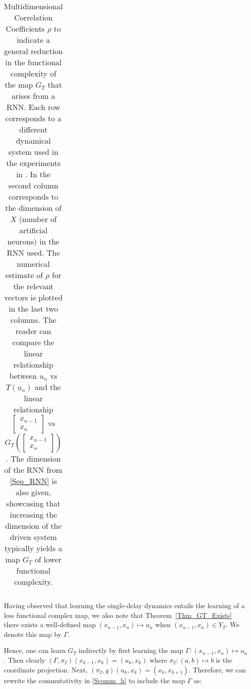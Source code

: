 \documentclass[12 pt]{article}
\begin{document}
\begin{center}
\begin{table}
{\begin{tabular}{|c|c| c c |}
    \end{tabular}}
    \caption{Multidimensional Correlation Coefficients $\rho$ to indicate a general reduction in the functional complexity of the map $G_T$ that arises from a RNN. Each row corresponds to a different dynamical system used in the experiments in \cite{Main_article}. In the second column corresponds to the dimension of $X$ (number of artificial neurons) in the RNN used. 
    The numerical estimate of $\rho$ for the relevant vectors is plotted in the last two columns. The reader can compare the linear relationship between $u_n$ vs $T(u_{n})$ and the linear relationship $\begin{bmatrix}
            x_{n-1}\\
            x_n
        \end{bmatrix}$ vs $G_T \left( \begin{bmatrix}
            x_{n-1}\\
            x_n
        \end{bmatrix}\right)$. The dimension of the RNN from \eqref{Seq_RNN} is also given, showcasing that increasing the dimension of the driven system typically yields a map $G_T$ of lower functional complexity.} \label{Table_FC}
    \end{table}
\end{center}




Having observed that learning the single-delay dynamics entails the learning of a less functional complex map, we also note that Theorem~\ref{Thm_GT_Exists} there exists a well-defined map $(x_{n-1},x_n) \mapsto u_{n}$ when $(x_{n-1},x_n) \in Y_T$. We denote this map by $\Gamma$.   



 




Hence,  one can learn $G_T$ indirectly by first learning the map $\Gamma: (x_{n-1},x_{n}) \mapsto u_n$. Then clearly $(\Gamma, \pi_2)(x_{k-1},x_{k}) =(u_k,x_k)$ where $\pi_2 : (a,b) \mapsto b$ is the coordinate projection. Next, $(\pi_2,g)(u_k,x_k) = (x_{k},x_{k+1})$. Therefore, we can rewrite the commutativity in \eqref{Scomm_h} to include the map $\Gamma$ as:
\end{document}
